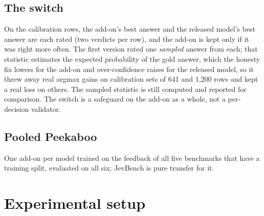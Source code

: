 \documentclass[11pt]{article}
\newcommand{\pk}{Peekaboo}
\begin{document}
\subsection{The switch}
\label{sec:switch}
On the calibration rows, the add-on's best answer and the released model's best answer are each rated (two verdicts per row), and the add-on is kept only if it was right more often. The first version rated one \emph{sampled} answer from each; that statistic estimates the expected probability of the gold answer, which the honesty fix lowers for the add-on and over-confidence raises for the released model, so it threw away real argmax gains on calibration sets of 641 and 1,200 rows and kept a real loss on others. The sampled statistic is still computed and reported for comparison. The switch is a safeguard on the add-on as a whole, not a per-decision validator.

\subsection{Pooled \pk{}}
One add-on per model trained on the feedback of all five benchmarks that have a training split, evaluated on all six; JevBench is pure transfer for it.

\section{Experimental setup}
\label{sec:setup}
\end{document}
